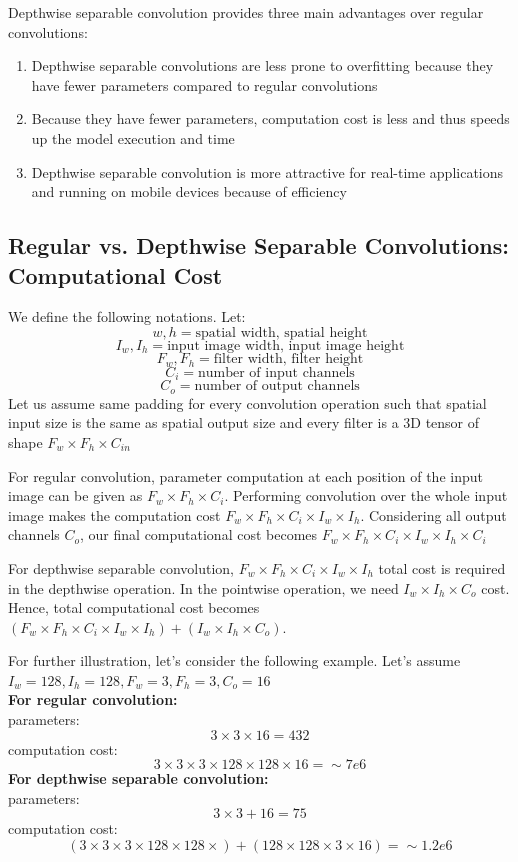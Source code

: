 \documentclass[master]{thesis-uestc}
\begin{document}
Depthwise separable convolution provides three main advantages over regular convolutions:
\begin{enumerate}
    \item Depthwise separable convolutions are less prone to overfitting because they have fewer parameters compared to regular convolutions
    \item Because they have fewer parameters, computation cost is less and thus speeds up the model execution and time
    \item Depthwise separable convolution is more attractive for real-time applications and running on mobile devices because of efficiency
\end{enumerate}

\subsection{Regular vs. Depthwise Separable Convolutions: Computational Cost}
We define the following notations. Let:
    \[w, h = \text{spatial width, spatial height}\]
    \[I_w, I_h = \text{input image width, input image height} \]
    \[F_w, F_h = \text{filter width, filter height}\]
    \[C_i = \text{number of input channels}\]
    \[C_o = \text{number of output channels}\]
Let us assume same padding for every convolution operation such that spatial input size is the same as spatial output size and every filter is a 3D tensor of shape $F_w \times F_h \times C_{in}$

For regular convolution, parameter computation at each position of the input image can be given as $F_w \times F_h \times C_i$. Performing convolution over the whole input image makes the computation cost $F_w \times F_h \times C_i \times I_w \times I_h$. Considering all output channels $C_o$, our final computational cost becomes $F_w \times F_h \times C_i \times I_w \times I_h \times C_i$

For depthwise separable convolution, $F_w \times F_h \times C_i \times I_w \times I_h$ total cost is required in the depthwise operation. In the pointwise operation, we need $I_w \times I_h \times C_o$ cost. Hence, total computational cost becomes $(F_w \times F_h \times C_i \times I_w \times I_h) + (I_w \times I_h \times C_o)$.

For further illustration, let's consider the following example. Let's assume $I_w = 128, I_h = 128, F_w = 3, F_h = 3, C_o = 16$ \\
\textbf{For regular convolution:} \\
parameters:
\[3 \times 3 \times 16 = 432\]
computation cost:
\[3 \times 3 \times 3 \times 128 \times 128 \times 16 = \sim7e6\]
\textbf{For depthwise separable convolution:}\\
parameters:
\[3 \times 3 + 16 = 75 \]
computation cost:
\[(3 \times 3 \times 3 \times 128 \times 128 \times) + (128 \times 128 \times 3 \times 16) = \sim1.2e6 \]
\end{document}
